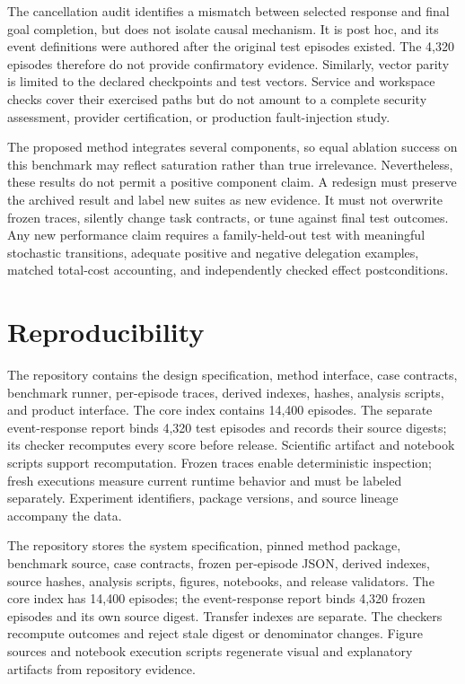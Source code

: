\documentclass[11pt]{article}
\begin{document}
The cancellation audit identifies a mismatch between selected response and final goal completion, but does not isolate causal mechanism. It is post hoc, and its event definitions were authored after the original test episodes existed. The 4,320 episodes therefore do not provide confirmatory evidence. Similarly, vector parity is limited to the declared checkpoints and test vectors. Service and workspace checks cover their exercised paths but do not amount to a complete security assessment, provider certification, or production fault-injection study.

The proposed method integrates several components, so equal ablation success on this benchmark may reflect saturation rather than true irrelevance. Nevertheless, these results do not permit a positive component claim. A redesign must preserve the archived result and label new suites as new evidence. It must not overwrite frozen traces, silently change task contracts, or tune against final test outcomes. Any new performance claim requires a family-held-out test with meaningful stochastic transitions, adequate positive and negative delegation examples, matched total-cost accounting, and independently checked effect postconditions.
\section{Reproducibility}
The repository contains the design specification, method interface, case contracts, benchmark runner, per-episode traces, derived indexes, hashes, analysis scripts, and product interface. The core index contains 14,400 episodes. The separate event-response report binds 4,320 test episodes and records their source digests; its checker recomputes every score before release. Scientific artifact and notebook scripts support recomputation. Frozen traces enable deterministic inspection; fresh executions measure current runtime behavior and must be labeled separately. Experiment identifiers, package versions, and source lineage accompany the data.


The repository stores the system specification, pinned method package, benchmark source, case contracts, frozen per-episode JSON, derived indexes, source hashes, analysis scripts, figures, notebooks, and release validators. The core index has 14,400 episodes; the event-response report binds 4,320 frozen episodes and its own source digest. Transfer indexes are separate. The checkers recompute outcomes and reject stale digest or denominator changes. Figure sources and notebook execution scripts regenerate visual and explanatory artifacts from repository evidence.
\end{document}
